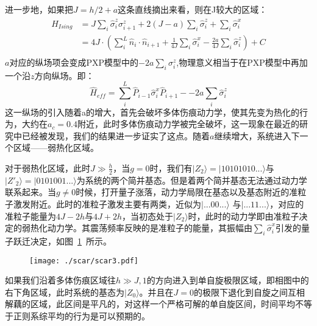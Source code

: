 进一步地，如果把$J=h/2+a$这条直线摘出来看，则在J较大的区域：
\begin{equation}
\begin{split}
\hat{H}_{Ising}&= J\sum_{i}\hat{\sigma}^z_i\sigma^z_{i+1} + 2(J-a)\sum_{i}\hat{\sigma}^z_i + \sum_i\hat{\sigma}^x_i \\
\quad &= 4J\cdot( \sum_{i}^{L} \hat{n}_i\cdot\hat{n}_{i+1} + \frac{1}{4J}\sum_i\hat{\sigma}^x_i - \frac{2a}{4J} \sum_{i}\hat{\sigma}^z_i  ) + C\\
\end{split}
\end{equation}
$a$对应的纵场项会变成PXP模型中的$-2a\sum_i\sigma^z_i$,物理意义相当于在PXP模型中再加一个沿$z$方向纵场。即：
\begin{equation}
\hat{H}_{eff} = \sum_{i}^{L} \hat{P}_{i-1}\hat{\sigma}_i^x\hat{P}_{i+1} -  -2a\sum_i\hat{\sigma}^z_i 
\end{equation}
这一纵场的引入随着a的增大，首先会破坏多体伤痕动力学，使其先变为热化的行为，大约在$a_c=0.4$附近，此时多体伤痕动力学被完全破坏，这一现象在最近的研究中已经被发现\cite{Yao2022quantum}，我们的结果进一步证实了这点。随着$a$继续增大，系统进入下一个区域——弱热化区域。


对于弱热化区域，此时$J \gg \frac{h}{2}$，当$g=0$时，我们有$|Z_2\rangle=|10101010...\rangle$与$|Z'_{2}\rangle=|0101001...\rangle$为系统的两个简并基态。但是着两个简并基态无法通过动力学联系起来。当$g\neq 0$时候，打开量子涨落，动力学局限在基态以及基态附近的准粒子激发附近。此时的准粒子激发主要有两类，近似为$|...00...\rangle$
与$|...11...\rangle$，对应的准粒子能量为$4J-2h$与$4J+2h$，当初态处于$|Z_2\rangle$时，此时的动力学即由准粒子决定的弱热化动力学。其震荡频率反映的是准粒子的能量，其振幅由$\sum_i \hat{\sigma}_i^x$引发的量子跃迁决定，如图~\ref{weak}~所示。

\begin{figure}[h]
\centering
\texttt{[image: ./scar/scar3.pdf]}
\label{weak}
\end{figure}


如果我们沿着多体伤痕区域往$h \gg J,1$的方向进入到单自旋极限区域，即相图中的右下角区域，此时系统的基态为$|Z_0\rangle$。并且在$J=0$的极限下退化到自旋之间互相解藕的区域，此区间是平凡的，对这样一个严格可解的单自旋区间，时间平均不等于正则系综平均的行为是可以预期的。

